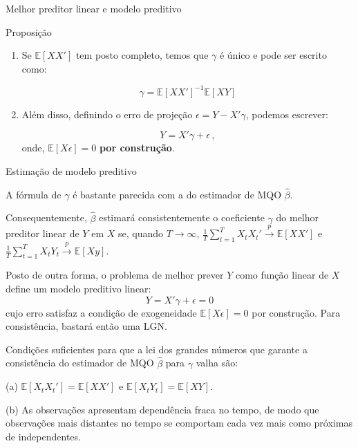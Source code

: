 \documentclass[11pt]{beamer}
\newenvironment{halfwideitemize}{\itemize\addtolength{\itemsep}{0.5em}}{\enditemize}
\begin{document}
	\begin{frame}{Melhor preditor linear e modelo preditivo}
			\begin{block}{Proposição}
			\begin{enumerate}
				\item 		Se $\mathbb{E}[XX']$ tem posto completo, temos que $\gamma$ é único e pode ser escrito como:
				
				$$\gamma = \mathbb{E}[XX']^{-1}\mathbb{E}[XY]$$
				
				\item Além disso, definindo o erro de projeção $\epsilon = Y- X'\gamma$, podemos escrever:
				
				$$Y = X'\gamma + \epsilon \, ,$$
				onde, $\mathbb{E}[X \epsilon] = 0$ \textbf{por construção}.
				
			\end{enumerate}
			
		\end{block}
	\end{frame}
	\begin{frame}{Estimação de modelo preditivo}
		\begin{halfwideitemize}
			\item A fórmula de $\gamma$ é bastante parecida com a do estimador de MQO $\hat{\beta}$.
			\begin{halfwideitemize}
				\item Consequentemente, $\hat{\beta}$ estimará consistentemente o coeficiente $\gamma$ do melhor preditor linear de $Y$ em $X$ se, quando $T \to \infty$, $\frac{1}{T}\sum_{t=1}^T X_t X_t' \overset{p}{\to} \mathbb{E}[XX']$ e $\frac{1}{T}\sum_{t=1}^T X_t Y_t \overset{p}{\to} \mathbb{E}[X y]$.
			\end{halfwideitemize}
			\item Posto de outra forma, o problema de melhor prever $Y$ como função linear de $X$ define um {\color{blue}modelo preditivo linear}:
			$$Y = X'\gamma + \epsilon = 0$$
			cujo erro satisfaz a condição de exogeneidade $\mathbb{E}[X\epsilon] = 0$ {\color{red}por construção}. Para consistência, bastará então uma LGN.
		\end{halfwideitemize}
			\begin{halfwideitemize}
			\item Condições suficientes para que a lei dos grandes números que garante a consistência do estimador de MQO $\hat{\beta}$ para $\gamma$ valha são:
			\begin{halfwideitemize}
				\item[(a)] $\mathbb{E}[X_t X_t'] = \mathbb{E}[XX']$ e $\mathbb{E}[X_t Y_t]=\mathbb{E}[X Y]$.
				\item[(b)] {\color{blue}As observações apresentam dependência fraca no tempo}, de modo que observações mais distantes no tempo se comportam cada vez mais como próximas de independentes.
			\end{halfwideitemize}
		\end{halfwideitemize}
	\end{frame}
\end{document}

